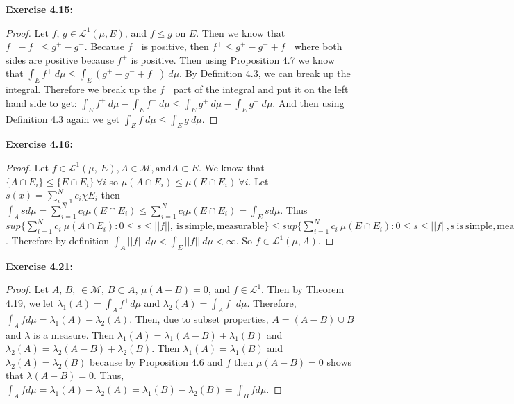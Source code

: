 \documentclass[letterpaper,12pt]{article}
\theoremstyle{definition}
\begin{document}
\noindent\textbf{ Exercise 4.15: }
\begin{proof}
Let $f$, $g \in \mathcal{L}^1(\mu \mathrm{, } E)$, and $f \leq g$ on $E$.  Then we know that $f^+ - f^- \leq g^+ - g^-$.  Because $f^-$ is positive, then $f^+ \leq g^+ - g^- + f^-$ where both sides are positive because $f^+$ is positive.  Then using Proposition 4.7 we know that $\int_E f^+ \:d\mu \leq \int_E (g^+ - g^- + f^-) \:d\mu$.   By Definition 4.3, we can break up the integral.  Therefore we break up the $f^-$ part of the integral and put it on the left hand side to get: $\int_E f^+ \: d\mu - \int_E f^- \:d\mu \leq \int_E g^+\:d\mu - \int_E g^- \: d\mu$.  And then using Definition 4.3 again we get $\int_E f \: d\mu \leq \int_E g \: d\mu$.
\end{proof}

\noindent\textbf{ Exercise 4.16: }
\begin{proof}
Let $f \in \mathcal{L}^1(\mu, \: E) \mathrm{, } A \in \mathcal{M} \mathrm{, and } A \subset E$.  We know that $\{A \cap E_i\} \leq \{E \cap E_i \} \:\forall i$ so $\mu(A \cap E_i) \leq \mu(E \cap E_i ) \:\forall i$. Let $s(x) = \sum^N_{i=1} c_i\chi E_i$ then $\int_A sd\mu = \sum^N_{i=1} c_i\mu(E\cap E_i) \leq \sum^N_{i=1} c_i\mu(E\cap E_i) = \int_E sd\mu$.  Thus $sup\{\sum^N_{i=1} c_i \: \mu(A \cap E_i) : 0 \leq s \leq ||f|| \mathrm{, \:is \:simple, measurable}\} \leq sup\{\sum^N_{i=1} c_i \: \mu(E \cap E_i) : 0 \leq s \leq ||f|| \mathrm{, s\:is \:simple, measurable}\}$.  Therefore by definition $\int_A ||f||\:d\mu < \int_E ||f||\:d\mu < \infty$.  So $f \in \mathcal{L}^1(\mu \mathrm{, } A)$.
\end{proof}

\noindent\textbf{ Exercise 4.21: }
\begin{proof}
Let $A$, $B$, $\in \mathcal{M}$, $B \subset A$, $\mu(A - B) = 0$, and $f \in \mathcal{L}^1$.  Then by Theorem 4.19, we let $\lambda_1(A) = \int_A f^+d\mu$ and $\lambda_2(A) = \int_A f^-d\mu$.  Therefore, $\int_A f d\mu = \lambda_1(A) - \lambda_2(A)$.  Then, due to subset properties, $ A = (A - B) \cup B$ and $\lambda$ is a measure.  Then $\lambda_1(A) = \lambda_1(A - B) + \lambda_1(B)$ and $\lambda_2(A) = \lambda_2(A - B) + \lambda_2(B)$.  Then $\lambda_1(A) = \lambda_1(B)$ and $\lambda_2(A) = \lambda_2(B)$ because by Proposition 4.6 and $f$ then $\mu(A - B) = 0$ shows that $\lambda(A - B) = 0$.  Thus, $\int_A fd\mu = \lambda_1(A) - \lambda_2(A) = \lambda_1(B) - \lambda_2(B) = \int_B fd\mu$.   
\end{proof}
\end{document}
